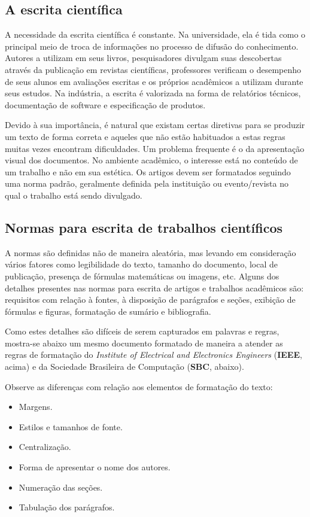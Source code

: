 \subsection{A escrita científica}
A necessidade da escrita científica é constante. Na universidade, ela é tida como o principal meio de troca de informações %
no processo de difusão do conhecimento. Autores a utilizam em seus livros, pesquisadores divulgam suas descobertas através da publicação em revistas científicas, professores verificam o desempenho de seus alunos em avaliações escritas e os próprios acadêmicos a utilizam durante seus estudos. Na indústria, a escrita é valorizada na forma de relatórios técnicos, documentação de software e especificação de produtos.

Devido à sua importância, é natural que existam certas diretivas para se produzir um texto de forma correta e aqueles que não estão habituados a estas regras muitas vezes encontram dificuldades. Um problema frequente é o da apresentação visual dos documentos. No ambiente acadêmico, o interesse está no conteúdo de um trabalho e não em sua estética. Os artigos devem ser formatados seguindo uma norma padrão, geralmente definida pela instituição ou evento/revista no qual o trabalho está sendo divulgado. 

\subsection{Normas para escrita de trabalhos científicos}
A normas são definidas não de maneira aleatória, mas levando em consideração vários fatores como legibilidade do texto, tamanho do documento, local de publicação, presença de fórmulas matemáticas ou imagens, etc. Alguns dos detalhes presentes nas normas para escrita de artigos e trabalhos acadêmicos são: requisitos com relação à fontes, à disposição de parágrafos e seções, exibição de fórmulas e figuras, formatação de sumário e bibliografia.

Como estes detalhes são difíceis de serem capturados em palavras e regras, mostra-se abaixo um mesmo documento formatado de maneira a atender as regras de formatação do {\slshape Institute of Electrical and Electronics Engineers} (\textbf{IEEE}, acima) e da Sociedade Brasileira de Computação (\textbf{SBC}, abaixo).

Observe as diferenças com relação aos elementos de formatação do texto:
\begin{itemize}
\item Margens.
\item Estilos e tamanhos de fonte.
\item Centralização.
\item Forma de apresentar o nome dos autores.
\item Numeração das seções.
\item Tabulação dos parágrafos.
\end{itemize}

